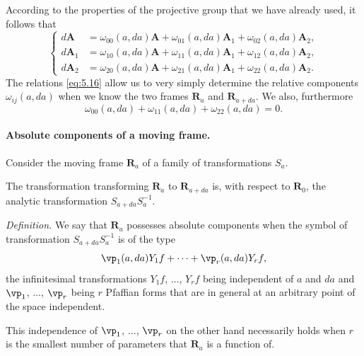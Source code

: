 According to the properties of the projective group that we have already used, it follows that
\begin{equation}
  \label{eq:5.16}
  \left\{
    \begin{aligned}
  d\mathbf{A}_{\phantom{0}}&=\omega_{00}(a,da)\mathbf{A}+\omega_{01}(a,da)\mathbf{A}_{1}+\omega_{02}(a,da)\mathbf{A}_{2},\\
  d\mathbf{A}_{{1}}&=\omega_{10}(a,da)\mathbf{A}+\omega_{11}(a,da)\mathbf{A}_{1}+\omega_{12}(a,da)\mathbf{A}_{2},\\
  d\mathbf{A}_{{2}}&=\omega_{20}(a,da)\mathbf{A}+\omega_{21}(a,da)\mathbf{A}_{1}+\omega_{22}(a,da)\mathbf{A}_{2}.      
    \end{aligned}
  \right.
\end{equation}
The relations \eqref{eq:5.16} allow us to very simply determine the relative components $\omega_{ij}(a,da)$ when we know the two frames $\mathbf{R}_{a}$ and $\mathbf{R}_{a+da}$. We also, furthermore
\begin{equation}
  \label{eq:5.17}
  \omega_{00}(a,da)+\omega_{11}(a,da)+\omega_{22}(a,da)=0.
\end{equation}


\paragraph{Absolute components of a moving frame.}
\label{sec:74}
Consider the moving frame $\mathbf{R}_{a}$ of a family of transformations $S_{a}$.

The transformation transforming $\mathbf{R}_{a}$ to $\mathbf{R}_{a+da}$ is, with respect to $\mathbf{R}_{0}$, the analytic transformation $S_{a+da}S_{a}^{-1}$.

\somespace

\emph{Definition.} We say that $\mathbf{R}_{a}$ possesses absolute components when the symbol of transformation $S_{a+da}S_{a}^{-1}$ is of the type
\begin{equation}
  \label{eq:5.18}
  \vp_{1}(a,da)Y_{1}f+\dots+\vp_{r}(a,da)Y_{r}f,
\end{equation}
the infinitesimal transformations $Y_{1}f$, $\dots$, $Y_{r}f$ being independent of $a$ and $da$ and $\vp_{1}$, $\dots$, $\vp_{r}$ being $r$ Pfaffian forms that are in general at an arbitrary point of the space independent.

This independence of $\vp_{1}$, $\dots$, $\vp_{r}$ on the other hand necessarily holds when $r$ is the smallest number of parameters that $\mathbf{R}_{a}$ is a function of.

